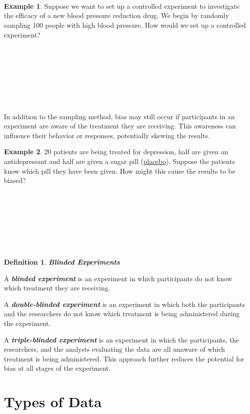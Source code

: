 \documentclass[
  11pt,
  oneside]{book}
\theoremstyle{definition}
\newtheorem{definition}{Definition}[chapter]
\theoremstyle{definition}
\newtheorem{example}{Example}[chapter]
\theoremstyle{definition}
\theoremstyle{definition}
\theoremstyle{remark}
\begin{document}
\(~\)

\(~\)

\(~\)

\begin{example}
Suppose we want to set up a controlled experiment to investigate the efficacy of a new blood pressure reduction drug. We begin by randomly sampling 100 people with high blood pressure. How would we set up a controlled experiment?
\end{example}

\(~\)

\(~\)

\(~\)

\(~\)

In addition to the sampling method, bias may still occur if participants in an experiment are aware of the treatment they are receiving. This awareness can influence their behavior or responses, potentially skewing the results.

\begin{example}
20 patients are being treated for depression, half are given an antidepressant and half are given a sugar pill (\underline{placebo}). Suppose the patients know which pill they have been given. How might this cause the results to be biased?
\end{example}

\(~\)

\(~\)

\(~\)

\(~\)

\begin{definition}
\textbf{\emph{Blinded Experiments}}

A \textbf{\emph{blinded experiment}} is an experiment in which participants do not know which treatment they are receiving.

A \textbf{\emph{double-blinded experiment}} is an experiment in which both the participants and the researchers do not know which treatment is being administered during the experiment.

A \textbf{\emph{triple-blinded experiment}} is an experiment in which the participants, the researchers, and the analysts evaluating the data are all unaware of which treatment is being administered. This approach further reduces the potential for bias at all stages of the experiment.
\end{definition}

\section{Types of Data}\label{types-of-data}
\end{document}
